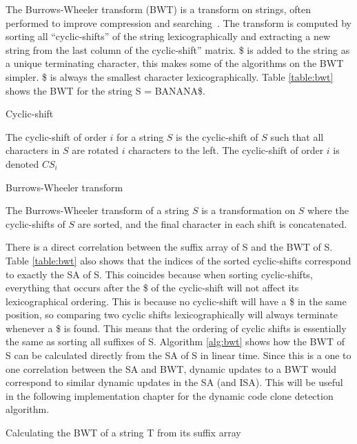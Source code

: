 The Burrows-Wheeler transform (BWT) is a transform on strings, often performed to improve
compression and searching~\cite{BWT}. The transform is computed by sorting all
``cyclic-shifts'' of the string lexicographically and extracting a new string from the
last column of the cyclic-shift'' matrix. \$ is added to the string as a unique
terminating character, this makes some of the algorithms on the BWT simpler. \$ is always
the smallest character lexicographically. Table \ref{table:bwt} shows the BWT for the
string S = BANANA\$.

\begin{definition}{Cyclic-shift}

    The cyclic-shift of order $i$ for a string $S$ is the cyclic-shift of $S$ such that
    all characters in $S$ are rotated $i$ characters to the left. The cyclic-shift of
    order $i$ is denoted $CS_i$

\end{definition}

\begin{definition}{Burrows-Wheeler transform}

    The Burrows-Wheeler transform of a string $S$ is a transformation on $S$ where the
    cyclic-shifts of $S$ are sorted, and the final character in each shift is concatenated.

\end{definition}

There is a direct correlation between the suffix array of S and the BWT of S. Table
\ref{table:bwt} also shows that the indices of the sorted cyclic-shifts correspond to
exactly the SA of S. This coincides because when sorting cyclic-shifts, everything that
occurs after the \$ of the cyclic-shift will not affect its lexicographical ordering. This
is because no cyclic-shift will have a \$ in the same position, so comparing two cyclic
shifts lexicographically will always terminate whenever a \$ is found. This means that the
ordering of cyclic shifts is essentially the same as sorting all suffixes of S. Algorithm
\ref{alg:bwt} shows how the BWT of S can be calculated directly from the SA of S in linear
time. Since this is a one to one correlation between the SA and BWT, dynamic updates to a BWT
would correspond to similar dynamic updates in the SA (and ISA). This will be useful in
the following implementation chapter for the dynamic code clone detection algorithm.

\begin{algorithm}[htp]
  \SetAlgoLined\DontPrintSemicolon

  \vspace{0.5cm}
  \caption{Calculating the BWT of a string T from its suffix array}
  \label{alg:bwt}
\end{algorithm}


